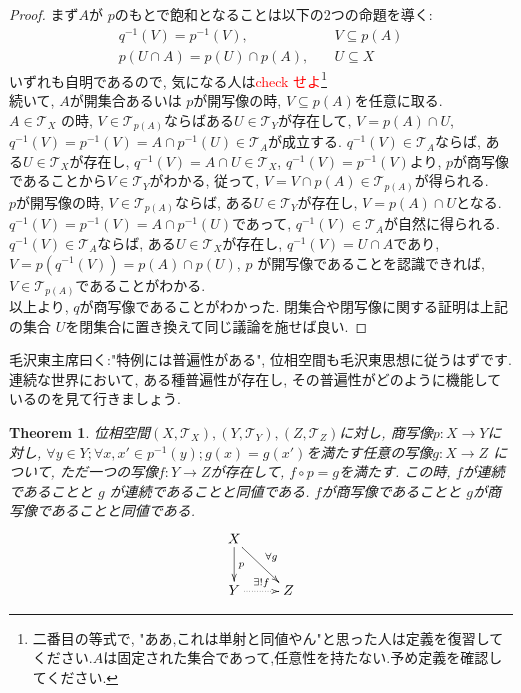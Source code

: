 \documentclass[dvipdfmx]{jbook}
\newtheorem{theorem}{Theorem}[section]
\theoremstyle{remark}
\theoremstyle{plain}
\begin{document}
\begin{proof}%
	まず$A$が $p$のもとで飽和となることは以下の2つの命題を導く:
	 \[
	\begin{aligned}%
		q^{-1}(V) = p ^{-1}(V), \quad & V \subseteq p(A)\\
		p(U\cap A) = p(U) \cap p(A), \quad & U\subseteq X 
	\end{aligned}
	\]
	いずれも自明であるので, 気になる人は\textcolor{red}{check せよ}\footnote{二番目の等式で, "ああ,これは単射と同値やん"と思った人は定義を復習してください.$A$は固定された集合であって,任意性を持たない.予め定義を確認してください.}\\
	続いて, $A$が開集合あるいは $p$が開写像の時,  $V \subseteq p(A)$を任意に取る.\\
	$A \in \mathcal{T}_X$ の時, $V \in \mathcal{T}_{p(A)}$ならばある$U \in \mathcal{T}_Y $が存在して, 
	$V = p(A) \cap U$, $q^{-1}(V) = p ^{-1}(V) = A \cap p^{-1}(U) \in \mathcal{T}_A$が成立する. 
	$q^{-1}(V) \in \mathcal{T}_A$ならば, ある$U \in \mathcal{T}_X$が存在し, 
	$q^{-1}(V) = A \cap U \in \mathcal{T}_X$, $q^{-1}(V) = p ^{-1}(V)$より, 
	$p$が商写像であることから$V \in \mathcal{T}_Y$がわかる, 従って, $V =V \cap p(A)\in \mathcal{T}_{p(A)}$が得られる. \\
	$p$が開写像の時,  $V \in \mathcal{T}_{p(A)}$ならば, ある$U \in \mathcal{T}_Y$が存在し, 
	$V = p(A) \cap U$となる. 
	$q^{-1}(V) = p ^{-1}(V) = A \cap p ^{-1}(U)$であって, 
	$q^{-1}(V) \in \mathcal{T}_A$が自然に得られる. 
	$q^{-1}(V) \in \mathcal{T}_A$ならば, ある$U \in \mathcal{T}_X$が存在し,
	$q^{-1} (V) =U \cap A$であり, $V=p(q^{-1}(V)) = p(A) \cap p(U)$, 
	$p$ が開写像であることを認識できれば, $V \in \mathcal{T}_{p(A)}$であることがわかる.\\
	以上より, $q$が商写像であることがわかった. 閉集合や閉写像に関する証明は上記の集合 $U$を閉集合に置き換えて同じ議論を施せば良い.
\end{proof}

毛沢東主席曰く:"特例には普遍性がある", 位相空間も毛沢東思想に従うはずです. 連続な世界において, ある種普遍性が存在し, その普遍性がどのように機能しているのを見て行きましょう.

\begin{theorem}%
	位相空間$\left( X, \mathcal{T}_X \right) ,\left( Y,\mathcal{T}_Y \right) , \left( Z , \mathcal{T}_Z\right) $に対し, 商写像$p: X \to Y$に対し, $\forall y \in Y; \forall x ,x'\in p ^{-1}({y});g(x)=g(x')$を満たす任意の写像$g: X \to Z$ について, ただ一つの写像$f: Y\to Z$が存在して, $f \circ p = g$を満たす. この時,  $f$が連続であることと $g$ が連続であることと同値である. $f$が商写像であることと $g$が商写像であることと同値である.
\[
	\xymatrix{
		X \ar[d]^{p} \ar[rd]^{\forall g} \\
		Y \ar@{..>}[r]^{\exists !f} &Z
	}
\] 		
\end{theorem}
\end{document}

